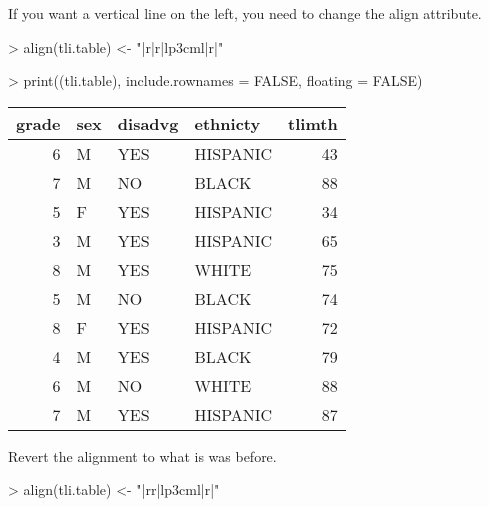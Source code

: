 \documentclass[letterpaper]{article}
\begin{document}
If you want a vertical line on the left, you need to change the align attribute.
\begin{Schunk}
\begin{Sinput}
> align(tli.table) <- "|r|r|lp{3cm}l|r|"
\end{Sinput}
\end{Schunk}
\begin{Schunk}
\begin{Sinput}
> print((tli.table), include.rownames = FALSE, floating = FALSE)
\end{Sinput}
% latex table generated in R 2.6.0 by xtable 1.5-2 package
% Wed Oct 10 14:26:37 2007
\begin{tabular}{|r|lp{3cm}l|r|}
  \hline
grade & sex & disadvg & ethnicty & tlimth \\
  \hline
6 & M & YES & HISPANIC & 43 \\
   7 & M & NO & BLACK & 88 \\
    5 & F & YES & HISPANIC &  34 \\
     3 & M & YES & HISPANIC &   65 \\
      8 & M & YES & WHITE &    75 \\
  5 & M & NO & BLACK & 74 \\
   8 & F & YES & HISPANIC & 72 \\
    4 & M & YES & BLACK &  79 \\
     6 & M & NO & WHITE &   88 \\
      7 & M & YES & HISPANIC &    87 \\
   \hline
\end{tabular}\end{Schunk}

Revert the alignment to what is was before.
\begin{Schunk}
\begin{Sinput}
> align(tli.table) <- "|rr|lp{3cm}l|r|"
\end{Sinput}
\end{Schunk}
\end{document}
